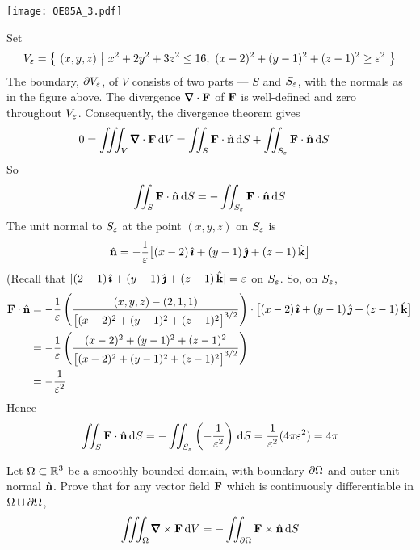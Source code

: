 \begin{solution}
\begin{center}
       \texttt{[image: OE05A\_3.pdf]}
\end{center}

\noindent Set
\begin{equation*}
V_\veps=\Set{(x,y,z)}{x^2+2y^2+3z^2\le 16,\ 
                (x-2)^2 + (y-1)^2 +(z-1)^2\ge\veps^2}
\end{equation*}
The boundary, $\partial V_\varepsilon$, of $V$ consists of two parts ---
$S$ and $S_\varepsilon$, with the normals as in the figure above. The divergence
$\vnabla\cdot\vF$ of $\mathbf{F}$ is well-defined and zero throughout $V_\varepsilon$.
Consequently, the divergence theorem gives
\begin{align*}
0 &= \tripInt_V\vnabla\cdot\vF\,\dee{V}
   = \dblInt_S \vF\cdot\hn\,\dee{S} 
      + \dblInt_{S_\veps} \vF\cdot\hn\,\dee{S}
\end{align*}
So
\begin{equation*}
\iint_S \mathbf{F}\cdot\hat{\mathbf{n}}\,\mathrm{d}S = -\iint_{S_\varepsilon} \mathbf{F}\cdot\hat{\mathbf{n}}\,\mathrm{d}S
\end{equation*}
The unit normal to $S_\varepsilon$ at the point $(x,y,z)$ on $S_\varepsilon$ is
\begin{equation*}
\hat{\mathbf{n}} =-\frac{1}{\varepsilon}\big[(x-2)\,\hat{\pmb{\imath}} + (y-1)\,\hat{\pmb{\jmath}} +(z-1)\,\hat{\mathbf{k}}\big]
\end{equation*}
(Recall that $|(2-1)\,\hat{\pmb{\imath}} + (y-1)\,\hat{\pmb{\jmath}} +(z-1)\,\hat{\mathbf{k}}|=\varepsilon$ on $S_\varepsilon$.
So, on $S_\varepsilon$,
\begin{align*}
\mathbf{F}\cdot\hat{\mathbf{n}} 
&= -\frac{1}{\varepsilon}
  \left(\frac{(x,y,z)-(2,1,1)}{{\big[(x-2)^2+(y-1)^2+(z-1)^2\big]}^{3/2}}\right)
  \cdot\big[(x-2)\,\hat{\pmb{\imath}} + (y-1)\,\hat{\pmb{\jmath}} +(z-1)\,\hat{\mathbf{k}}\big] \\
&=-\frac{1}{\varepsilon} \left(\frac{(x-2)^2+(y-1)^2+(z-1)^2}{{\big[(x-2)^2+(y-1)^2+(z-1)^2\big]
                                                        }^{3/2}}\right)\\
&= -\frac{1}{\varepsilon^2}
\end{align*}
Hence
\begin{align*}
\iint_S \mathbf{F}\cdot\hat{\mathbf{n}}\,\mathrm{d}S 
= -\iint_{S_\varepsilon}   \left(-\frac{1}{\varepsilon^2}\right)\,\mathrm{d}S
=\frac{1}{\varepsilon^2} (4\pi\varepsilon^2)
=4\pi
\end{align*}

\end{solution}

\begin{question}[M317 2005A] %
Let $\Omega\subset\mathbb{R}^3$ be a smoothly bounded domain, with boundary $\partial\Omega$ and outer unit normal $\hat{\mathbf{n}}$. Prove that for any vector field $\mathbf{F}$ which is continuously differentiable in $\Omega\cup\partial\Omega$,
\begin{equation*}
\tripInt_\Om \vnabla\times\vF\,\dee{V}
   = -\dblInt_{\partial\Om} \vF\times\hn\,\dee{S}
\end{equation*}
\end{question}

